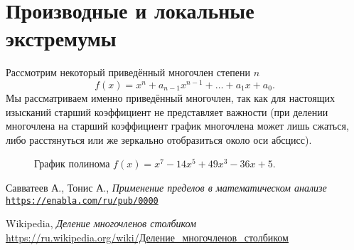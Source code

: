 \documentclass[12pt]{article}
\begin{document}
\section{Производные и локальные экстремумы}
Рассмотрим некоторый приведённый многочлен степени $n$
\begin{equation}
  f(x) = x^n + a_{n-1} x^{n-1} + \ldots + a_1 x + a_0.
\end{equation}
Мы рассматриваем именно приведённый многочлен, так как для настоящих изысканий старший коэффициент не представляет важности (при делении многочлена на старший коэффициент график многочлена может лишь сжаться, либо расстянуться или же зеркально отобразиться около оси абсцисс).
\begin{figure}[htbp]
  \label{fig:5}
	\centering
	\caption{График полинома $f(x) = x^{7} - 14 x^{5} + 49 x^{3} - 36 x+5$.}
\end{figure}
\begin{thebibliography}{9}
	Савватеев А., Тонис А., \textit{Применение пределов в математическом анализе}
	\\\texttt{\url{https://enabla.com/ru/pub/0000}}
	
	Wikipedia, \textit{Деление многочленов столбиком}
	\\\href{https://ru.wikipedia.org/wiki/\%D0\%94\%D0\%B5\%D0\%BB\%D0\%B5\%D0\%BD\%D0\%B8\%D0\%B5_\%D0\%BC\%D0\%BD\%D0\%BE\%D0\%B3\%D0\%BE\%D1\%87\%D0\%BB\%D0\%B5\%D0\%BD\%D0\%BE\%D0\%B2_\%D1\%81\%D1\%82\%D0\%BE\%D0\%BB\%D0\%B1\%D0\%B8\%D0\%BA\%D0\%BE\%D0\%BC}{https://ru.wikipedia.org/wiki/Деление\_многочленов\_столбиком}
\end{thebibliography}
\end{document}
